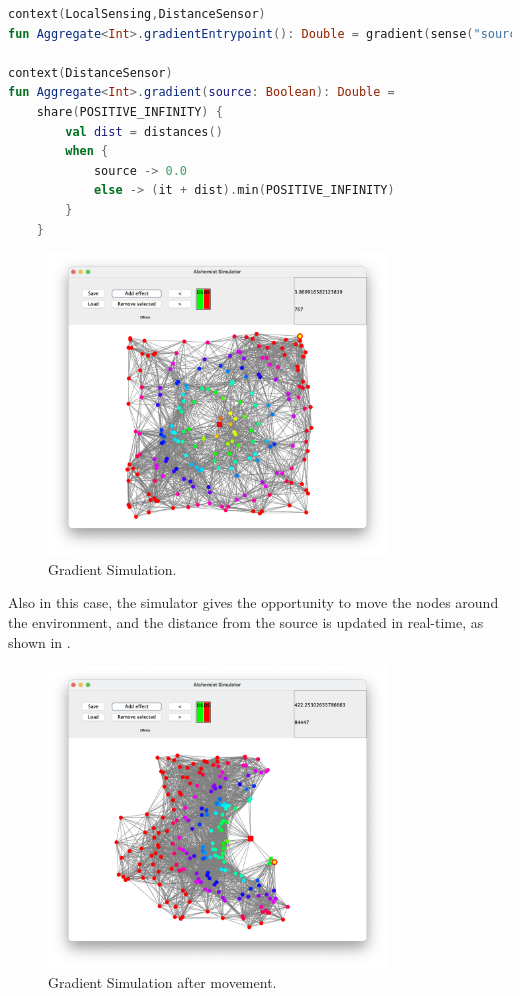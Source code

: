 \begin{lstlisting}[language=kt, caption={Gradient code example}, label={lst:gradient-example}]
context(LocalSensing,DistanceSensor)
fun Aggregate<Int>.gradientEntrypoint(): Double = gradient(sense("source"))

context(DistanceSensor)
fun Aggregate<Int>.gradient(source: Boolean): Double =
    share(POSITIVE_INFINITY) {
        val dist = distances()
        when {
            source -> 0.0
            else -> (it + dist).min(POSITIVE_INFINITY)
        }
    }
\end{lstlisting}

\begin{figure}[ht!]
    \centering
    \includegraphics[width=0.8\textwidth]{figures/gradient}
    \caption{Gradient Simulation.}
    \label{fig:gradient}
\end{figure}

Also in this case, the simulator gives the opportunity to move the nodes around the environment, and the distance from
the source is updated in real-time, as shown in .
\begin{figure}[ht!]
    \centering
    \includegraphics[width=0.8\textwidth]{figures/gradient-moved}
    \caption{Gradient Simulation after movement.}
    \label{fig:gradient-moved}
\end{figure}

